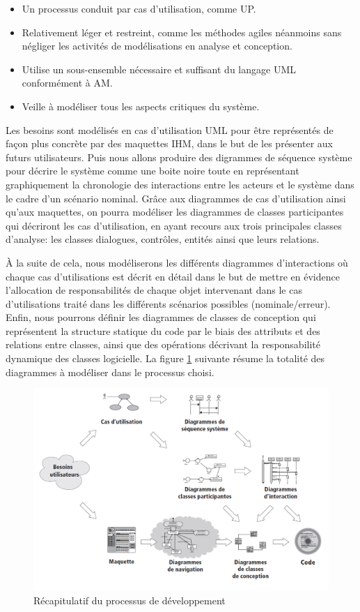 \begin{itemize}
    \item [\textbullet] Un processus conduit par cas d’utilisation, comme UP.
    \item [\textbullet] Relativement léger et restreint, comme les méthodes
        agiles néanmoins sans négliger les activités de modélisations en analyse
        et conception.  
    \item [\textbullet] Utilise un sous-ensemble nécessaire et
    suffisant du langage UML conformément à AM.
    \item [\textbullet] Veille à modéliser tous les aspects critiques du système.
\end{itemize}
        
Les besoins sont modélisés en cas d’utilisation UML pour être représentés de
façon plus concrète par des maquettes IHM, dans le but de les présenter aux
futurs utilisateurs. Puis nous allons produire des digrammes de séquence système
pour décrire le système comme une boite noire toute en représentant
graphiquement la chronologie des interactions entre les acteurs et le système
dans le cadre d’un scénario nominal. Grâce aux diagrammes de cas d’utilisation
ainsi qu’aux maquettes, on pourra modéliser les diagrammes de classes
participantes qui décriront les cas d’utilisation, en ayant recours aux trois
principales classes d’analyse: les classes dialogues, contrôles, entités ainsi
que leurs relations.

À la suite de cela, nous modéliserons les différents diagrammes d’interactions
où chaque cas d’utilisations est décrit en détail dans le but de mettre en
évidence l’allocation de responsabilités de chaque objet intervenant dans le cas
d’utilisations traité dans les différents scénarios possibles
(nominale/erreur). Enfin, nous pourrons définir les diagrammes de classes de
conception qui représentent la structure statique du code par le biais des
attributs et des relations entre classes, ainsi que des opérations décrivant la
responsabilité dynamique des classes logicielle.  La figure \ref{fig1} suivante
résume la totalité des diagrammes à modéliser dans le processus choisi.

\begin{figure}[h!]
  \centering
  \includegraphics[width=12cm]{images/processus_dev.png}
  \vspace{-10pt}
  \caption{Récapitulatif du processus de développement \cite{5}}
  \label{fig1}
\end{figure}

